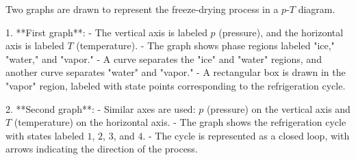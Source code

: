 Two graphs are drawn to represent the freeze-drying process in a \( p \)-\( T \) diagram.  

1. **First graph**:  
   - The vertical axis is labeled \( p \) (pressure), and the horizontal axis is labeled \( T \) (temperature).  
   - The graph shows phase regions labeled "ice," "water," and "vapor."  
   - A curve separates the "ice" and "water" regions, and another curve separates "water" and "vapor."  
   - A rectangular box is drawn in the "vapor" region, labeled with state points corresponding to the refrigeration cycle.  

2. **Second graph**:  
   - Similar axes are used: \( p \) (pressure) on the vertical axis and \( T \) (temperature) on the horizontal axis.  
   - The graph shows the refrigeration cycle with states labeled \( 1 \), \( 2 \), \( 3 \), and \( 4 \).  
   - The cycle is represented as a closed loop, with arrows indicating the direction of the process.